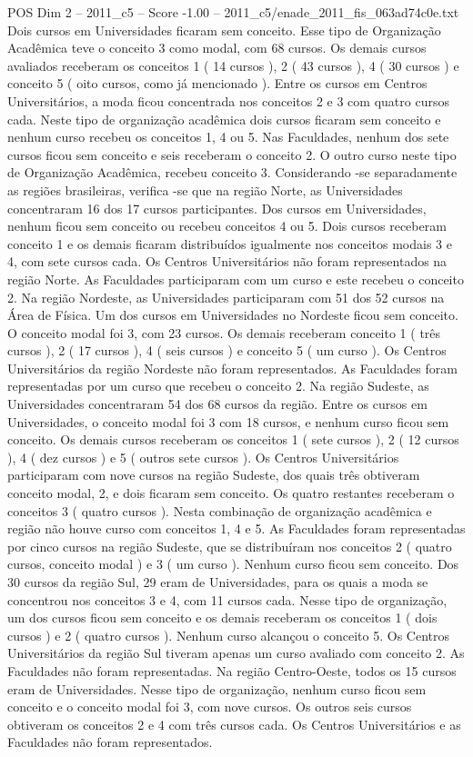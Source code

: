 \begin{textsample}{POS Dim 2 – 2011\_c5 – Score -1.00 – 2011\_c5/enade\_2011\_fis\_063ad74c0e.txt}
Dois cursos em Universidades ficaram sem conceito.
Esse tipo de Organização Acadêmica teve o conceito 3 como modal, com 68 cursos.
Os demais cursos avaliados receberam os conceitos 1 ( 14 cursos ), 2 ( 43 cursos ), 4 ( 30 cursos ) e conceito 5 ( oito cursos, como já mencionado ).
Entre os cursos em Centros Universitários, a moda ficou concentrada nos conceitos 2 e 3 com quatro cursos cada.
Neste tipo de organização acadêmica dois cursos ficaram sem conceito e nenhum curso recebeu os conceitos 1, 4 ou 5.
Nas Faculdades, nenhum dos sete cursos ficou sem conceito e seis receberam o conceito 2.
O outro curso neste tipo de Organização Acadêmica, recebeu conceito 3.
Considerando -se separadamente as regiões brasileiras, verifica -se que na região Norte, as Universidades concentraram 16 dos 17 cursos participantes.
Dos cursos em Universidades, nenhum ficou sem conceito ou recebeu conceitos 4 ou 5.
Dois cursos receberam conceito 1 e os demais ficaram distribuídos igualmente nos conceitos modais 3 e 4, com sete cursos cada.
Os Centros Universitários não foram representados na região Norte.
As Faculdades participaram com um curso e este recebeu o conceito 2.
Na região Nordeste, as Universidades participaram com 51 dos 52 cursos na Área de Física.
Um dos cursos em Universidades no Nordeste ficou sem conceito.
O conceito modal foi 3, com 23 cursos.
Os demais receberam conceito 1 ( três cursos ), 2 ( 17 cursos ), 4 ( seis cursos ) e conceito 5 ( um curso ).
Os Centros Universitários da região Nordeste não foram representados.
As Faculdades foram representadas por um curso que recebeu o conceito 2.
Na região Sudeste, as Universidades concentraram 54 dos 68 cursos da região.
Entre os cursos em Universidades, o conceito modal foi 3 com 18 cursos, e nenhum curso ficou sem conceito.
Os demais cursos receberam os conceitos 1 ( sete cursos ), 2 ( 12 cursos ), 4 ( dez cursos ) e 5 ( outros sete cursos ).
Os Centros Universitários participaram com nove cursos na região Sudeste, dos quais três obtiveram conceito modal, 2, e dois ficaram sem conceito.
Os quatro restantes receberam o conceitos 3 ( quatro cursos ).
Nesta combinação de organização acadêmica e região não houve curso com conceitos 1, 4 e 5.
As Faculdades foram representadas por cinco cursos na região Sudeste, que se distribuíram nos conceitos 2 ( quatro cursos, conceito modal ) e 3 ( um curso ).
Nenhum curso ficou sem conceito.
Dos 30 cursos da região Sul, 29 eram de Universidades, para os quais a moda se concentrou nos conceitos 3 e 4, com 11 cursos cada.
Nesse tipo de organização, um dos cursos ficou sem conceito e os demais receberam os conceitos 1 ( dois cursos ) e 2 ( quatro cursos ).
Nenhum curso alcançou o conceito 5.
Os Centros Universitários da região Sul tiveram apenas um curso avaliado com conceito 2.
As Faculdades não foram representadas.
Na região Centro-Oeste, todos os 15 cursos eram de Universidades.
Nesse tipo de organização, nenhum curso ficou sem conceito e o conceito modal foi 3, com nove cursos.
Os outros seis cursos obtiveram os conceitos 2 e 4 com três cursos cada.
Os Centros Universitários e as Faculdades não foram representados.

\end{textsample}
